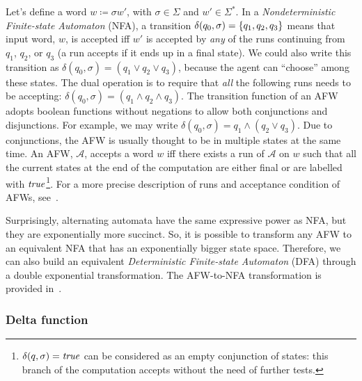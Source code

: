 Let's define a word $w \coloneqq \sigma w'$, with $\sigma \in \Sigma$ and $w'
\in \Sigma^*$.  In a \emph{Nondeterministic Finite-state Automaton}
(NFA), a transition
$\delta(q_0, \sigma) = \{q_1, q_2, q_3\}$ means that input word, $w$, is
accepted iff $w'$ is accepted by \emph{any} of the runs continuing from $q_1$,
$q_2$, or $q_3$ (a run accepts if it ends up in a final state).  We could also
write this transition as $\delta(q_0, \sigma) = (q_1 \lor q_2 \lor q_3)$,
because the agent can ``choose'' among these states. The dual operation is to
require that \emph{all} the following runs needs to be accepting: $\delta(q_0,
\sigma) = (q_1 \land q_2 \land q_3)$. The transition function of an AFW adopts
boolean functions without negations to allow both conjunctions and
disjunctions. For example, we may write $\delta(q_0, \sigma) = q_1 \land (q_2
\lor q_3)$. Due to conjunctions, the AFW is usually thought to be in multiple
states at the same time. An AFW, $\mathcal{A}$, accepts a word $w$ iff there
exists a run of $\mathcal{A}$ on $w$ such that all the current states at the
end of the computation are either final or are labelled with
$\text{\textit{true}}$\footnote{$\delta(q, \sigma) = \text{\textit{true}}$ can be considered as an empty
conjunction of states: this branch of the computation accepts without the need
of further tests.}. For a more precise description of runs and acceptance
condition of AFWs, see~\cite{bib:temp-logic-automata}.

Surprisingly, alternating automata have the same expressive power as NFA, but
they are exponentially more succinct. So, it is possible to transform any AFW
to an equivalent NFA that has an exponentially bigger state space. Therefore,
we can also build an equivalent \emph{Deterministic Finite-state Automaton}
(DFA) through a double
exponential transformation. The AFW-to-NFA transformation is provided
in~\cite{bib:temp-logic-automata}.


\subsubsection{Delta function}

